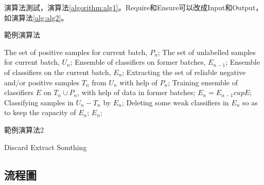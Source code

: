 演算法測試，演算法\ref{algorithm:alg1}。Require和Ensure可以改成Input和Output，如演算法\ref{alg:alg2}。

\begin{algorithm}[!htb]
    \caption{範例演算法}
    \label{algorithm:alg1}
    \begin{algorithmic}[1]
        \Require
        The set of positive samples for current batch, $P_n$;
        The set of unlabelled samples for current batch, $U_n$;
        Ensemble of classifiers on former batches, $E_{n-1}$;
        \Ensure
        Ensemble of classifiers on the current batch, $E_n$;
        \State Extracting the set of reliable negative and/or positive samples $T_n$ from $U_n$ with help of $P_n$;
        \label{code:fram:extract}
        \State Training ensemble of classifiers $E$ on $T_n \cup P_n$, with help of data in former batches;
        \label{code:fram:trainbase}
        \State $E_n=E_{n-1}cup E$;
        \label{code:fram:add}
        \State Classifying samples in $U_n-T_n$ by $E_n$;
        \label{code:fram:classify}
        \State Deleting some weak classifiers in $E_n$ so as to keep the capacity of $E_n$;
        \label{code:fram:select}
        \Return $E_n$;
    \end{algorithmic}
\end{algorithm}

\begin{algorithm}[!htb]
    \caption{範例演算法2}
    \label{alg:alg2}
    \renewcommand{\algorithmicrequire}{\textbf{Input:}}
	\renewcommand{\algorithmicensure}{\textbf{Output:}}
    \begin{algorithmic}[1]
                \State Discard
            \Else
                \State Extract Somthing
            \EndIf
        \EndFor
    \end{algorithmic}
\end{algorithm}

\clearpage

\subsection{流程圖}

